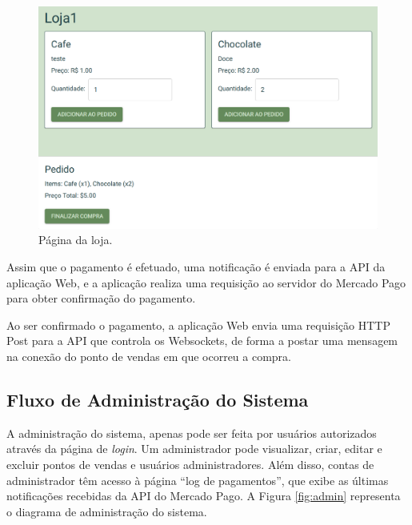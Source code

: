 \begin{figure}
	\caption{\label{fig:loja}Página da loja.}
	\begin{center}
		\includegraphics[width=\textwidth]{figuras/loja.png}
	\end{center}
\end{figure}

Assim que o pagamento é efetuado, uma notificação é enviada para a API da aplicação Web, e a aplicação realiza uma requisição ao servidor do Mercado Pago para obter confirmação do pagamento.

Ao ser confirmado o pagamento, a aplicação Web envia uma requisição HTTP Post para a API que controla os Websockets, de forma a postar uma mensagem na conexão do ponto de vendas em que ocorreu a compra.

\subsection{Fluxo de Administração do Sistema}

A administração do sistema, apenas pode ser feita por usuários autorizados através da página de \textit{login}. Um administrador pode visualizar, criar, editar e excluir pontos de vendas e usuários administradores. Além disso, contas de administrador têm acesso à página ``log de pagamentos'',  que exibe as últimas notificações recebidas da API do Mercado Pago. A Figura \ref{fig:admin} representa o diagrama de administração do sistema.

